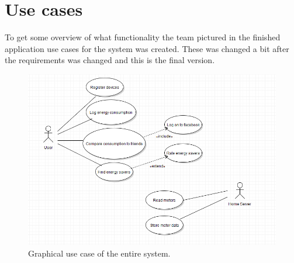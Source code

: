 \section{Use cases}
To get some overview of what functionality the team pictured in the finished application use cases for the system was created. These was changed a bit after the requirements was changed and this is the final version. 


\begin{figure}[H]
\includegraphics[width=\textwidth]{ch/specification/fig/usecase.png}
\caption{Graphical use case of the entire system.}
\label{fig:usecase}
\end{figure}

